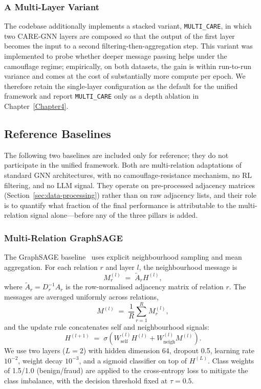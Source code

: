 \subsubsection{A Multi-Layer Variant}
\label{sec:multi-care}

The codebase additionally implements a stacked variant, \texttt{MULTI\_CARE}, in which two CARE-GNN layers are composed so that the output of the first layer becomes the input to a second filtering-then-aggregation step. This variant was implemented to probe whether deeper message passing helps under the camouflage regime; empirically, on both datasets, the gain is within run-to-run variance and comes at the cost of substantially more compute per epoch. We therefore retain the single-layer configuration as the default for the unified framework and report \texttt{MULTI\_CARE} only as a depth ablation in Chapter~\ref{Chapter4}.

\subsection{Reference Baselines}
\label{sec:baselines}

The following two baselines are included only for reference; they do not participate in the unified framework. Both are multi-relation adaptations of standard GNN architectures, with no camouflage-resistance mechanism, no RL filtering, and no LLM signal. They operate on pre-processed adjacency matrices (Section~\ref{sec:data-processing}) rather than on raw adjacency lists, and their role is to quantify what fraction of the final performance is attributable to the multi-relation signal alone---before any of the three pillars is added.

\subsubsection{Multi-Relation GraphSAGE}

The GraphSAGE baseline~\cite{hamilton2017inductive} uses explicit neighbourhood sampling and mean aggregation. For each relation $r$ and layer $l$, the neighbourhood message is
\begin{equation}
M^{(l)}_r \;=\; \tilde{A}_r H^{(l)},
\end{equation}
where $\tilde{A}_r = D_r^{-1} A_r$ is the row-normalised adjacency matrix of relation $r$. The messages are averaged uniformly across relations,
\begin{equation}
M^{(l)} \;=\; \frac{1}{R} \sum_{r=1}^{R} M^{(l)}_r,
\end{equation}
and the update rule concatenates self and neighbourhood signals:
\begin{equation}
H^{(l+1)} \;=\; \sigma\!\left( W_{\mathrm{self}}^{(l)} H^{(l)} + W_{\mathrm{neigh}}^{(l)} M^{(l)} \right).
\end{equation}
We use two layers ($L = 2$) with hidden dimension 64, dropout 0.5, learning rate $10^{-2}$, weight decay $10^{-3}$, and a sigmoid classifier on top of $H^{(L)}$. Class weights of 1.5/1.0 (benign/fraud) are applied to the cross-entropy loss to mitigate the class imbalance, with the decision threshold fixed at $\tau = 0.5$.

